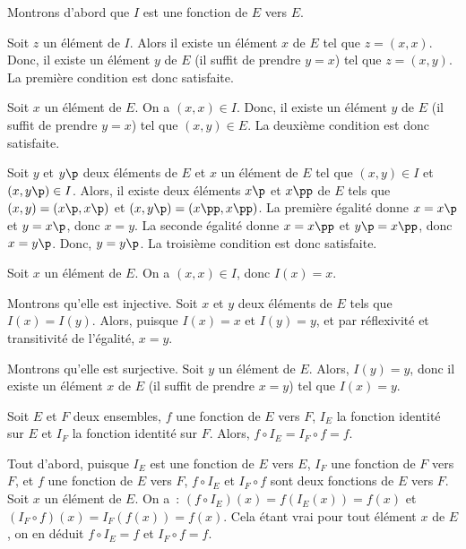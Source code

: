 \noindent{} 
\startitemize[nowhite]
    \item Montrons d'abord que $I$ est une fonction de $E$ vers $E$. 
        \startitemize[nowhite]
            \item Soit $z$ un élément de $I$. 
                Alors il existe un élément $x$ de $E$ tel que $z = (x,x)$. 
                Donc, il existe un élément $y$ de $E$ (il suffit de prendre $y=x$) tel que $z = (x,y)$.
                La première condition est donc satisfaite.
            \item Soit $x$ un élément de $E$. 
                On a $(x,x) \in I$. 
                Donc, il existe un élément $y$ de $E$ (il suffit de prendre $y = x$) tel que $(x,y) \in E$.
                La deuxième condition est donc satisfaite.
            \item Soit $y$ et $y\p$ deux éléments de $E$ et $x$ un élément de $E$ tel que $(x,y) \in I$ et $(x,y\p) \in I$.
                Alors, il existe deux éléments $x\p$ et $x\pp$ de $E$ tels que $(x,y) = (x\p,x\p)$ et $(x,y\p) = (x\pp,x\pp)$. 
                La première égalité donne $x = x\p$ et $y = x\p$, donc $x = y$.
                La seconde égalité donne $x = x\pp$ et $y\p = x\pp$, donc $x = y\p$. 
                Donc, $y = y\p$.
                La troisième condition est donc satisfaite.
        \stopitemize
    \item Soit $x$ un élément de $E$.
        On a $(x,x) \in I$, donc $I(x) = x$.
    \item Montrons qu'elle est injective.
        Soit $x$ et $y$ deux éléments de $E$ tels que $I(x) = I(y)$. 
        Alors, puisque $I(x) = x$ et $I(y) = y$, et par réflexivité et transitivité de l'égalité, $x = y$.
    \item Montrons qu'elle est surjective. 
        Soit $y$ un élément de $E$. 
        Alors, $I(y) = y$, donc il existe un élément $x$ de $E$ (il suffit de prendre $x = y$) tel que $I(x) = y$.
\stopitemize

\done

\blank[medium]

\noindent{} Soit $E$ et $F$ deux ensembles, $f$ une fonction de $E$ vers $F$, $I_E$ la fonction identité sur $E$ et $I_F$ la fonction identité sur $F$. 
    Alors, $f \circ I_E = I_F \circ f = f$.

\blank[medium]

\noindent{} 
    Tout d'abord, puisque $I_E$ est une fonction de $E$ vers $E$, $I_F$ une fonction de $F$ vers $F$, et $f$ une fonction de $E$ vers $F$, $f \circ I_E$ et $I_F \circ f$ sont deux fonctions de $E$ vers $F$. 
    Soit $x$ un élément de $E$. 
    On a : $(f \circ I_E)(x) = f(I_E(x)) = f(x)$ et $(I_F \circ f)(x) = I_F(f(x)) = f(x)$.
    Cela étant vrai pour tout élément $x$ de $E$, on en déduit $f \circ I_E = f$ et $I_F \circ f = f$.

